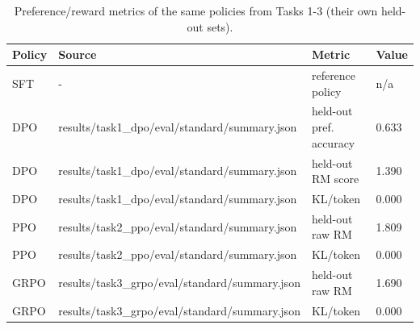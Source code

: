 \begin{table}[t]
\centering
\small
\caption{Preference/reward metrics of the same policies from Tasks 1-3 (their own held-out sets).}
\begin{tabular}{llll}
\toprule
Policy & Source & Metric & Value \\
\midrule
SFT & - & reference policy & n/a \\
DPO & results/task1\_dpo/eval/standard/summary.json & held-out pref. accuracy & 0.633 \\
DPO & results/task1\_dpo/eval/standard/summary.json & held-out RM score & 1.390 \\
DPO & results/task1\_dpo/eval/standard/summary.json & KL/token & 0.000 \\
PPO & results/task2\_ppo/eval/standard/summary.json & held-out raw RM & 1.809 \\
PPO & results/task2\_ppo/eval/standard/summary.json & KL/token & 0.000 \\
GRPO & results/task3\_grpo/eval/standard/summary.json & held-out raw RM & 1.690 \\
GRPO & results/task3\_grpo/eval/standard/summary.json & KL/token & 0.000 \\
\bottomrule
\end{tabular}
\end{table}

